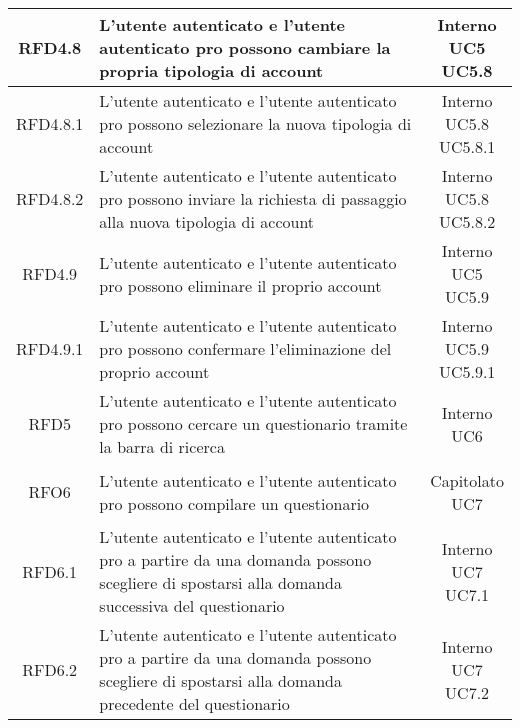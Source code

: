 \begin{longtable}{|c|>{\centering}m{7cm}|c|}
			 \hypertarget{{RFD4.8}}{{RFD4.8}} & L’utente autenticato e l’utente
autenticato pro possono cambiare la
propria tipologia di account & \makecell{Interno\\ UC5 \\UC5.8 } \\ \hline
			 \hypertarget{{RFD4.8.1}}{{RFD4.8.1}} & L’utente autenticato e l’utente
autenticato pro possono selezionare la nuova tipologia di account & \makecell{Interno\\ UC5.8 \\UC5.8.1 } \\ \hline
			 \hypertarget{{RFD4.8.2}}{{RFD4.8.2}} & L’utente autenticato e l’utente autenticato pro possono inviare la richiesta di passaggio alla nuova tipologia di account & \makecell{Interno\\ UC5.8 \\UC5.8.2 } \\ \hline
			 \hypertarget{{RFD4.9}}{{RFD4.9}} & L’utente autenticato e l’utente autenticato pro possono eliminare il proprio account & \makecell{Interno\\ UC5 \\UC5.9 } \\ \hline
			 \hypertarget{{RFD4.9.1}}{{RFD4.9.1}} & L’utente autenticato e l’utente
autenticato pro possono confermare
l’eliminazione del proprio account & \makecell{Interno\\ UC5.9 \\UC5.9.1 } \\ \hline
			 \hypertarget{{RFD5}}{{RFD5}} & L’utente autenticato e l’utente
autenticato pro possono cercare un
questionario tramite la barra di ricerca & \makecell{Interno\\ UC6 } \\ \hline
			 \hypertarget{{RFO6}}{{RFO6}} & L’utente autenticato e l’utente
autenticato pro possono compilare un
questionario & \makecell{Capitolato\\ UC7 } \\ \hline
			 \hypertarget{{RFD6.1}}{{RFD6.1}} & L’utente autenticato e l’utente
autenticato pro a partire da una
domanda possono scegliere di spostarsi
alla domanda successiva del questionario & \makecell{Interno\\ UC7 \\UC7.1 } \\ \hline
			 \hypertarget{{RFD6.2}}{{RFD6.2}} & L’utente autenticato e l’utente
autenticato pro a partire da una
domanda possono scegliere di spostarsi
alla domanda precedente del questionario & \makecell{Interno\\ UC7 \\UC7.2 } \\ \hline

\end{longtable}
